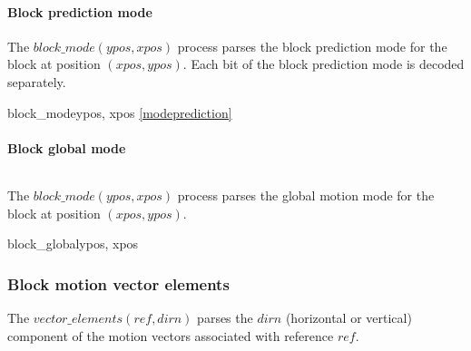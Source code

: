\paragraph{Block prediction mode}
\label{blockmode}

The $block\_mode(ypos,xpos)$ process parses the block prediction mode for the block at position $(xpos, ypos)$. Each
bit of the block prediction mode is decoded separately.

\begin{pseudo}{block\_mode}{ypos, xpos}
     {\ref{modeprediction}}
\bsEND
\end{pseudo}

\paragraph{Block global mode}
\label{blockglobal}
$\ $\newline

The $block\_mode(ypos,xpos)$ process parses the global motion mode for the block at position $(xpos, ypos)$.

\begin{pseudo}{block\_global}{ypos, xpos}
\bsCODE{\BlockData[y][x][global]=\false}
\bsIF{\PictureUsingGlobal==\true}
    \bsIF{\BlockData[ypos][xpos][mode]!=\Intra}
    \bsEND
\bsEND
\end{pseudo}

\subsubsection{Block motion vector elements}
\label{blockmvelements}

The $vector\_elements(ref,dirn)$ parses the $dirn$ (horizontal or vertical) component of the motion vectors associated with
reference $ref$.

